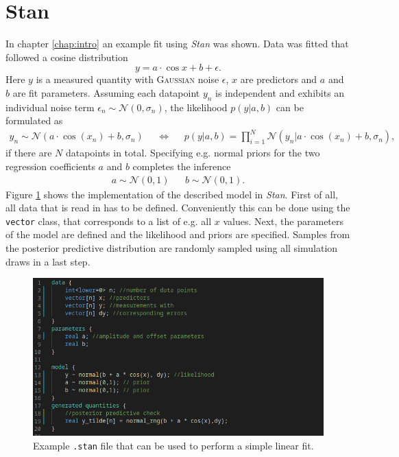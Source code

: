 \section{Stan}
In chapter \ref{chap:intro} an example fit using \emph{Stan} was shown. Data was fitted that followed a cosine distribution
\begin{equation}
	y=a\cdot \cos x +b+\epsilon.
\end{equation}
Here $y$ is a measured quantity with \textsc{Gaussian} noise $\epsilon$, $x$ are predictors and $a$ and $b$ are fit parameters. Assuming each datapoint $y_n$ is independent and exhibits an individual noise term $\epsilon_n\sim\mathcal{N}(0,\sigma_n)$, the likelihood $p(y|a,b)$ can be formulated as
\begin{align}
	y_n\sim\mathcal{N}(a\cdot\cos(x_n) +b,\sigma_n)&&\Leftrightarrow& &p(y|a,b)=\prod_{i=1}^N\mathcal{N}(y_n|a\cdot\cos(x_n)+b,\sigma_n),
\end{align} 
if there are $N$ datapoints in total. Specifying e.g. normal priors for the two regression coefficients $a$ and $b$ completes the inference
\begin{align}
	a\sim\mathcal{N}(0,1)&&b\sim\mathcal{N}(0,1).
\end{align}
Figure \ref{fig:stan} shows the implementation of the described model in \emph{Stan}. First of all, all data that is read in has to be defined. Conveniently this can be done using the \texttt{vector} class, that corresponds to a list of e.g. all $x$ values. Next, the parameters of the model are defined and the likelihood and priors are specified. Samples from the posterior predictive distribution are randomly sampled using all simulation draws in a last step.
\begin{figure}[htbp]
	\centering
	\includegraphics[width=\linewidth]{../demonstration/stanfile.png}
	\caption{Example \texttt{.stan} file that can be used to perform a simple linear fit.}
	\label{fig:stan}
\end{figure}
